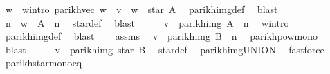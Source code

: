 \begin{isabellebody}
\ w\ \ w{\isacharunderscore}{\kern0pt}intro{\isacharcolon}{\kern0pt}\ {\isachardoublequoteopen}parikh{\isacharunderscore}{\kern0pt}vec\ w\ {\isacharequal}{\kern0pt}\ v\ {\isasymand}\ w\ {\isasymin}\ star\ A{\isachardoublequoteclose}\ \isamarkupfalse%
\ parikh{\isacharunderscore}{\kern0pt}img{\isacharunderscore}{\kern0pt}def\ \isamarkupfalse%
\ blast\isanewline
\ \ \isamarkupfalse%
\ \isamarkupfalse%
\ n\ \ {\isachardoublequoteopen}w\ {\isasymin}\ A\ {\isacharcircum}{\kern0pt}{\isacharcircum}{\kern0pt}\ n{\isachardoublequoteclose}\ \isamarkupfalse%
\ star{\isacharunderscore}{\kern0pt}def\ \isamarkupfalse%
\ blast\isanewline
\ \ \isamarkupfalse%
\ \isamarkupfalse%
\ {\isachardoublequoteopen}v\ {\isasymin}\ parikh{\isacharunderscore}{\kern0pt}img\ {\isacharparenleft}{\kern0pt}A\ {\isacharcircum}{\kern0pt}{\isacharcircum}{\kern0pt}\ n{\isacharparenright}{\kern0pt}{\isachardoublequoteclose}\ \isamarkupfalse%
\ w{\isacharunderscore}{\kern0pt}intro\ \isamarkupfalse%
\ parikh{\isacharunderscore}{\kern0pt}img{\isacharunderscore}{\kern0pt}def\ \isamarkupfalse%
\ blast\isanewline
\ \ \isamarkupfalse%
\ assms\ \isamarkupfalse%
\ {\isachardoublequoteopen}v\ {\isasymin}\ parikh{\isacharunderscore}{\kern0pt}img\ {\isacharparenleft}{\kern0pt}B\ {\isacharcircum}{\kern0pt}{\isacharcircum}{\kern0pt}\ n{\isacharparenright}{\kern0pt}{\isachardoublequoteclose}\ \isamarkupfalse%
\ parikh{\isacharunderscore}{\kern0pt}pow{\isacharunderscore}{\kern0pt}mono\ \isamarkupfalse%
\ blast\isanewline
\ \ \isamarkupfalse%
\ \isamarkupfalse%
\ {\isachardoublequoteopen}v\ {\isasymin}\ parikh{\isacharunderscore}{\kern0pt}img\ {\isacharparenleft}{\kern0pt}star\ B{\isacharparenright}{\kern0pt}{\isachardoublequoteclose}\ \isamarkupfalse%
\ star{\isacharunderscore}{\kern0pt}def\ \isamarkupfalse%
\ parikh{\isacharunderscore}{\kern0pt}img{\isacharunderscore}{\kern0pt}UNION\ \isamarkupfalse%
\ fastforce\isanewline
{}\isamarkupfalse%
%
\endisatagproof
{\isafoldproof}%
%
\isadelimproof
\isanewline
%
\endisadelimproof
\isanewline
{}\isamarkupfalse%
\ parikh{\isacharunderscore}{\kern0pt}star{\isacharunderscore}{\kern0pt}mono{\isacharunderscore}{\kern0pt}eq{\isacharcolon}{\kern0pt}\isanewline

\end{isabellebody}
